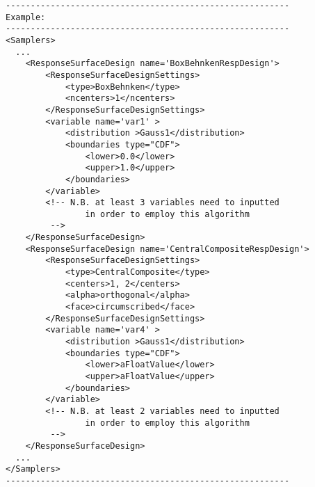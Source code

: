\begin{lstlisting}[style=XML]
---------------------------------------------------------
Example:
---------------------------------------------------------
<Samplers>
  ...
    <ResponseSurfaceDesign name='BoxBehnkenRespDesign'>
        <ResponseSurfaceDesignSettings>
            <type>BoxBehnken</type>
            <ncenters>1</ncenters>
        </ResponseSurfaceDesignSettings>
        <variable name='var1' >
            <distribution >Gauss1</distribution>
            <boundaries type="CDF">
                <lower>0.0</lower>
                <upper>1.0</upper>
            </boundaries>
        </variable>
        <!-- N.B. at least 3 variables need to inputted 
                in order to employ this algorithm
         -->
    </ResponseSurfaceDesign>
    <ResponseSurfaceDesign name='CentralCompositeRespDesign'>
        <ResponseSurfaceDesignSettings>
            <type>CentralComposite</type>
            <centers>1, 2</centers>
            <alpha>orthogonal</alpha>
            <face>circumscribed</face>
        </ResponseSurfaceDesignSettings>
        <variable name='var4' >
            <distribution >Gauss1</distribution>
            <boundaries type="CDF">
                <lower>aFloatValue</lower>
                <upper>aFloatValue</upper>
            </boundaries>
        </variable>
        <!-- N.B. at least 2 variables need to inputted 
                in order to employ this algorithm
         -->        
    </ResponseSurfaceDesign>
  ...
</Samplers>
---------------------------------------------------------
\end{lstlisting}

